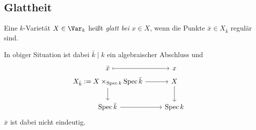 \subsection{Glattheit}

\begin{definition}[glatt]
    Eine $k$-Varietät $X \in \Var_k$ heißt \emph{glatt bei $x\in X$}, wenn
    die Punkte $\bar x \in X_{\bar k}$ regulär sind.
\end{definition}

\begin{bemerkung}
    In obiger Situation ist dabei $\bar k \mid k$ ein algebraischer Abschluss
    und 
    \[\begin{tikzcd}
        \bar x \rar[mapsto] 
        & x\\[-15pt]
        X_{\bar k} := X \times_{\Spec k} \Spec \bar k \rar \dar 
        & X \dar
        \\
        \Spec \bar k \rar
        & \Spec k
    \end{tikzcd}\]
    $\bar x$ ist dabei nicht eindeutig.
\end{bemerkung}




